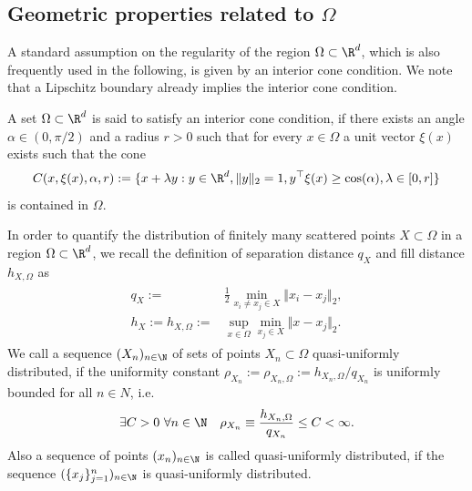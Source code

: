 \documentclass[a4paper, 10pt]{article}
\begin{document}
%
%


\subsection{Geometric properties related to $\Omega$} \label{subsec:geometric_properties}

A standard assumption on the regularity of the region $\Omega \subset \R^d$, 
which is also frequently used in the following, is given by an interior cone condition.
We note that a Lipschitz boundary already implies the interior cone condition. 
%
\begin{definition}
A set $\Omega \subset \R^d$ is said to satisfy an interior cone condition, if there exists an angle $\alpha \in (0, \pi/2)$ and a radius $r>0$ such that for every $x \in \Omega$ a unit vector $\xi(x)$ exists such that the cone 
\begin{align}
\label{eq:definition_cone}
C(x, \xi(x), \alpha, r) := \{ x + \lambda y: y \in \R^d, \Vert y \Vert_2 = 1, y^\top \xi(x) \geq \cos(\alpha), \lambda \in [0, r] \}
\end{align}
is contained in $\Omega$.
\end{definition}
%

In order to quantify the distribution of finitely many scattered points $X \subset \Omega$ in a region $\Omega \subset \R^d$, 
we recall the definition of separation distance $q_{X}$ and fill distance $h_{X, \Omega}$ as
\begin{align}
\label{eq:fill_sep_dist}
\begin{aligned}
q_{X} :=& \frac{1}{2} \min_{x_i \neq x_j \in X} \Vert x_i - x_j \Vert_2, \\
h_X := h_{X, \Omega} :=& \sup_{x \in \Omega} \min_{x_j \in X} \Vert x - x_j \Vert_2.
\end{aligned}
\end{align}
We call a sequence $(X_n)_{n \in \N}$ of sets of points $X_n \subset \Omega$ quasi-uniformly distributed, 
if the uniformity constant $\rho_{X_n} := \rho_{X_n, \Omega} := h_{X_n, \Omega} / q_{X_n}$ is uniformly bounded for all $n \in N$, i.e.\
\begin{align}
\label{eq:uniformly_distributed_points}
\exists C>0 ~ \forall n \in \N \quad \rho_{X_n} \equiv \frac{h_{X_n, \Omega}}{q_{X_n}} \leq C < \infty.
\end{align}
%
%
Also a sequence of points $( x_n )_{n \in \N}$ is called quasi-uniformly distributed, 
if the sequence $( \{x_j\}_{j=1}^n )_{n \in \N}$ is quasi-uniformly distributed.
\end{document}
